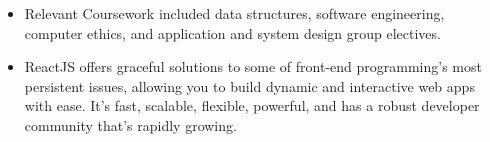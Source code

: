 	\begin{itemize}
		\item Relevant Coursework included data structures, software engineering, computer ethics, and application and system design group electives.
	\end{itemize}

	\medskip

	\begin{itemize}
		\item ReactJS offers graceful solutions to some of front-end programming’s most persistent issues, allowing you to build dynamic and interactive web apps with ease. It’s fast, scalable, flexible, powerful, and has a robust developer community that’s rapidly growing.
	\end{itemize}
